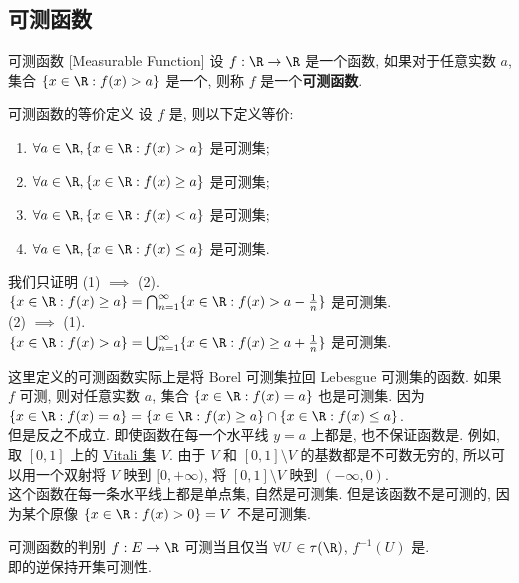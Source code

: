 \subsection{可测函数}
\begin{dfn}
    {可测函数}
    [Measurable Function]
    设 \(f:\R\to\R\) 是一个函数, 如果对于任意实数 \(a\), 集合 \(\{x\in\R: f(x)>a\}\) 是一个\MeasurableSet{}, 则称 \(f\) 是一个\textbf{可测函数}.
\end{dfn}
\begin{ppt}
    {可测函数的等价定义}
    设 \(f\) 是\MeasurableFunc{}, 则以下定义等价:
    \begin{enumerate}
        \item \(\forall a\in\R, \{x\in\R: f(x)>a\}\) 是可测集;
        \item \(\forall a\in\R, \{x\in\R: f(x)\geq a\}\) 是可测集;
        \item \(\forall a\in\R, \{x\in\R: f(x)<a\}\) 是可测集;
        \item \(\forall a\in\R, \{x\in\R: f(x)\leq a\}\) 是可测集.
    \end{enumerate}
\end{ppt}
\begin{prf}
    我们只证明 (1) $\implies$ (2). \\
    \(\{x\in\R: f(x)\geq a\}=\bigcap_{n=1}^\infty \{x\in\R: f(x)>a-\frac{1}{n}\}\) 是可测集.\\
    (2) $\implies$ (1). \\
    \(\{x\in\R: f(x)>a\}=\bigcup_{n=1}^\infty \{x\in\R: f(x)\geq a+\frac{1}{n}\}\) 是可测集.
\end{prf}
\begin{rmk}
    这里定义的可测函数实际上是将 Borel 可测集拉回 Lebesgue 可测集的函数.
    \tcbline
    如果 \(f\) 可测, 则对任意实数 \(a\), 集合 \(\{x\in\R: f(x)=a\}\) 也是可测集. 因为 \(\{x\in\R: f(x)=a\}=\{x\in\R: f(x)\geq a\}\cap \{x\in\R: f(x)\leq a\}\). \\
    但是反之不成立. 即使函数在每一个水平线 \(y=a\) 上都是\MeasurableSet{}, 也不保证函数是\MeasurableFunc{}. 例如, 取 \([0,1]\) 上的 \hyperref[thm:vitali-set]{Vitali 集} \(V\). 由于 \(V\) 和 \([0,1]\setminus V\) 的基数都是不可数无穷的, 所以可以用一个双射将 \(V\) 映到 \([0, +\infty)\), 将 \([0,1]\setminus V\) 映到 \((-\infty, 0)\). \\
    这个函数在每一条水平线上都是单点集, 自然是可测集. 但是该函数不是可测的, 因为某个原像 \(\{x\in\R: f(x)>0\}=V\) 不是可测集.
\end{rmk}
\begin{ppt}
    {可测函数的判别}
    \(f:E\to\R\) 可测当且仅当 \(\forall U\in\tau(\R)\), \(f^{-1}(U)\) 是\MeasurableSet{}.\\
    即\MeasurableFunc{}的逆保持开集可测性.
\end{ppt}
